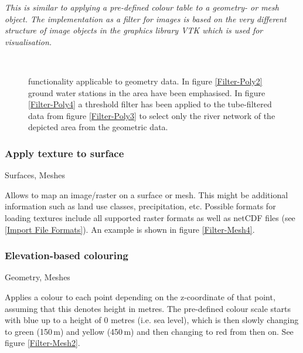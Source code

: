  \emph{This is similar to applying a pre-defined colour table to a geometry- or mesh object. The implementation as a filter for images is based on the very different structure of image objects in the graphics library VTK which is used for visualisation.}

\begin{figure}[tb]
\begin{center}
\enspace
{} \\
\enspace
{}
\end{center}
\caption{\ogs functionality applicable to geometry data. In figure \ref{Filter-Poly2} ground water stations in the area have been emphasised. In figure \ref{Filter-Poly4} a threshold filter has been applied to the tube-filtered data from figure \ref{Filter-Poly3} to select only the river network of the depicted area from the geometric data.} \label{fig:filter:poly}
\end{figure}

\subsubsection{Apply texture to surface}
 Surfaces, Meshes

 Allows to map an image/raster on a surface or mesh. This might be additional information such as land use classes, precipitation, etc. Possible formats for loading textures include all supported raster formats as well as netCDF files (see \ref{Import File Formats}). An example is shown in figure \ref{Filter-Mesh4}.

\subsubsection{Elevation-based colouring}
 Geometry, Meshes

 Applies a colour to each point depending on the z-coordinate of that point, assuming that this denotes height in metres. The pre-defined colour scale starts with blue up to a height of $0$ metres (i.e. sea level), which is then slowly changing to green (150\,m) and yellow (450\,m) and then changing to red from then on. See figure \ref{Filter-Mesh2}.

